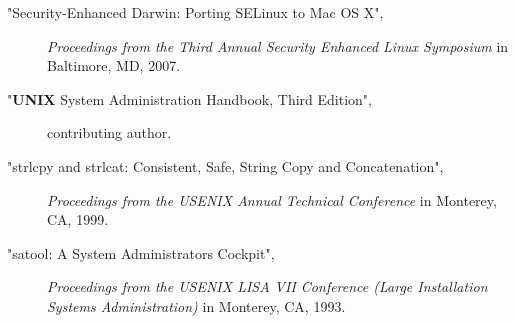 \documentclass[letterpaper,11pt]{article}
\begin{document}
\begin{description}
\item["Security-Enhanced Darwin: Porting SELinux to Mac OS X",]
\emph{Proceedings from the Third Annual Security Enhanced Linux Symposium} in Baltimore, MD, 2007.
\item["{\sc \bf UNIX} System Administration Handbook, Third Edition",]
contributing author.
\item["strlcpy and strlcat:  Consistent, Safe, String Copy and Concatenation",]
\emph{Proceedings from the USENIX Annual Technical Conference} in Monterey, CA, 1999.
\item["satool:  A System Administrators Cockpit",]
\emph{Proceedings from the USENIX LISA VII Conference (Large Installation Systems Administration)} in Monterey, CA, 1993.
\end{description}
\end{document}

